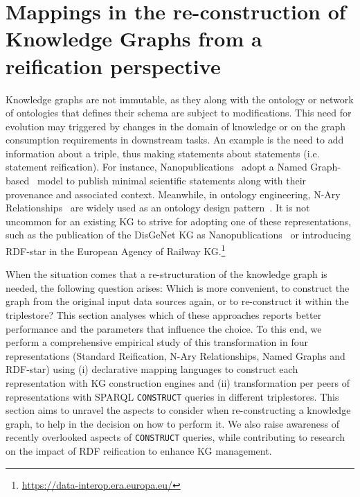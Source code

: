 

\section{Mappings in the re-construction of Knowledge Graphs from a reification perspective}
\label{sec:chp6-1_re-construction}

Knowledge graphs are not immutable, as they along with the ontology or network of ontologies that defines their schema are subject to modifications. This need for evolution may triggered by changes in the domain of knowledge or on the graph consumption requirements in downstream tasks. 
An example is the need to add information about a triple, thus making statements about statements (i.e. statement reification).
For instance, Nanopublications~\citep{groth2010nanopubs} adopt a Named Graph-based~\citep{carroll2005named} model to publish minimal scientific statements along with their provenance and associated context. Meanwhile, in ontology engineering, N-Ary Relationships~\citep{naryw3c2006} are widely used as an ontology design pattern~\citep{gangemi2013multi}. It is not uncommon for an existing KG to strive for adopting one of these representations, such as the publication of the DisGeNet KG as Nanopublications~\citep{queralt2016disgenet} or introducing RDF-star in the European Agency of Railway  KG.\footnote{\url{https://data-interop.era.europa.eu/}}

When the situation comes that a re-structuration of the knowledge graph is needed, the following question arises: Which is more convenient, to construct the graph from the original input data sources again, or to re-construct it within the triplestore? This section analyses which of these approaches reports better performance and the parameters that influence the choice. 
To this end, we perform a comprehensive empirical study of this transformation in four representations (Standard Reification, N-Ary Relationships, Named Graphs and RDF-star) using (i) declarative mapping languages to construct each representation with KG construction engines and (ii) transformation per peers of representations with SPARQL \texttt{CONSTRUCT} queries in different triplestores. This section aims to unravel the aspects to consider when re-constructing a knowledge graph, to help in the decision on how to perform it. We also raise awareness of recently overlooked aspects of \texttt{CONSTRUCT} queries, while contributing to research on the impact of RDF reification to enhance KG management.

